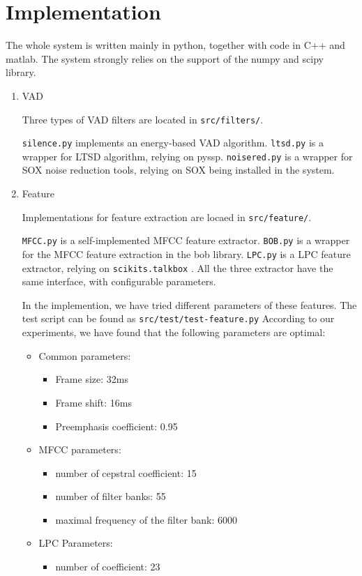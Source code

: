 
\section{Implementation}
The whole system is written mainly in python, together with code in C++ and matlab.
The system strongly relies on the support of the numpy\cite{numpy} and scipy\cite{scipy} library.

\begin{enumerate}
    \item VAD

      Three types of  VAD filters are located in \verb|src/filters/|.

      \verb|silence.py| implements an energy-based VAD algorithm.
      \verb|ltsd.py| is a wrapper for LTSD algorithm, relying on pyssp\cite{pyssp}.
      \verb|noisered.py| is a wrapper for SOX noise reduction tools, relying on SOX \cite{sox} being
      installed in the system.

    \item Feature

      Implementations for feature extraction are locaed in \verb|src/feature/|.

      \verb|MFCC.py| is a self-implemented MFCC feature extractor.
      \verb|BOB.py| is a wrapper for the MFCC feature extraction in the bob \cite{bob2012} library.
      \verb|LPC.py| is a LPC feature extractor, relying on \verb|scikits.talkbox| \cite{talkbox}.
      All the three extractor have the same interface, with configurable parameters.

      In the implemention, we have  tried different parameters of these features.
      The test script can be found as \verb|src/test/test-feature.py|
      According to our experiments, we have found that the following parameters are optimal:
      \begin{itemize}
        \item Common parameters:
          \begin{itemize}
            \item Frame size: 32ms
            \item Frame shift: 16ms
            \item Preemphasis coefficient: 0.95
          \end{itemize}
        \item MFCC parameters:
          \begin{itemize}
            \item number of cepstral coefficient: 15
            \item number of filter banks: 55
            \item maximal frequency of the filter bank: 6000
          \end{itemize}
        \item LPC Parameters:
          \begin{itemize}
            \item number of coefficient: 23
          \end{itemize}
      \end{itemize}


\end{enumerate}
